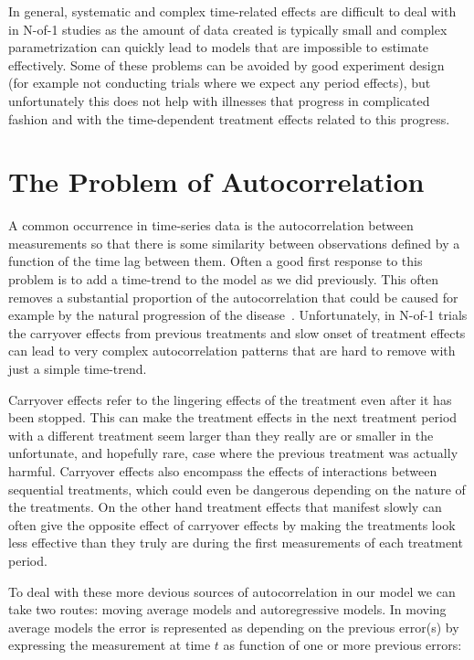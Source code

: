 \documentclass[12pt,a4paper,leqno]{report}
\theoremstyle{plain}
\theoremstyle{definition}
\theoremstyle{remark}
\begin{document}
In general, systematic and complex time-related effects are difficult to
deal with in N-of-1 studies as the amount of data created is typically small
and complex parametrization can quickly lead to models that are impossible to estimate
effectively. Some of these problems can be avoided by good experiment design (for example not
conducting trials where we expect any period effects), but unfortunately this does not
help with illnesses that progress in complicated fashion and with the time-dependent
treatment effects related to this progress.

\section{The Problem of Autocorrelation}\label{autocor}

A common occurrence in time-series data is the autocorrelation between
measurements so that there is some similarity between observations defined by a
function of the time lag between them. Often a good first response to this problem
is to add a time-trend to the model as we did previously. This
often removes a substantial proportion of the autocorrelation that could be
caused for example by the natural progression of the disease\ \cite{stat}.
Unfortunately, in N-of-1 trials the carryover effects
from previous treatments and slow onset of treatment effects can lead to very
complex autocorrelation patterns that are hard to remove with just a simple time-trend.

Carryover effects refer to the lingering effects of the treatment even after it
has been stopped. This can make the treatment effects in the next treatment period
with a different treatment seem larger than they really are or smaller in the
unfortunate, and hopefully rare, case where the previous treatment was actually
harmful. Carryover effects also encompass the effects of interactions between
sequential treatments, which could even be dangerous depending on the nature of
the treatments. On the other hand treatment effects that manifest slowly can
often give the opposite effect of carryover effects by making the treatments
look less effective than they truly are during the first measurements of each
treatment period.\cite{stat}

To deal with these more devious sources of autocorrelation in our model we can
take two routes: moving average models and autoregressive models. In moving
average models the error is represented as depending on the previous error(s) by
expressing the measurement at time \(t\) as function of one or more previous
errors:
\end{document}
